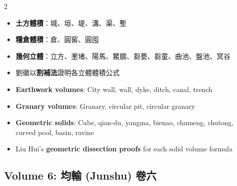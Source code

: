 \documentclass[10pt,a4paper]{article}
\begin{document}
\begin{paracol}{2}
\begin{leftcolumn*}
\begin{itemize}[leftmargin=1.2em,topsep=1pt,itemsep=1pt]
  \item \textbf{土方體積}：城、垣、堤、溝、渠、塹
  \item \textbf{糧倉體積}：倉、圓窖、圓囤
  \item \textbf{幾何立體}：立方、壍堵、陽馬、鱉臑、芻甍、芻童、曲池、盤池、冥谷
  \item 劉徽以\textbf{割補法}證明各立體體積公式
\end{itemize}
\end{leftcolumn*}
\begin{rightcolumn*}
\begin{itemize}[leftmargin=1.2em,topsep=1pt,itemsep=1pt]
  \item \textbf{Earthwork volumes}: City wall, wall, dyke, ditch, canal, trench
  \item \textbf{Granary volumes}: Granary, circular pit, circular granary
  \item \textbf{Geometric solids}: Cube, qian-du, yangma, bienao, chumeng, chutong, curved pool, basin, ravine
  \item Liu Hui's \textbf{geometric dissection proofs} for each solid volume formula
\end{itemize}
\end{rightcolumn*}
\end{paracol}

\subsection*{Volume 6: 均輸 (Junshu) 卷六}
\end{document}

